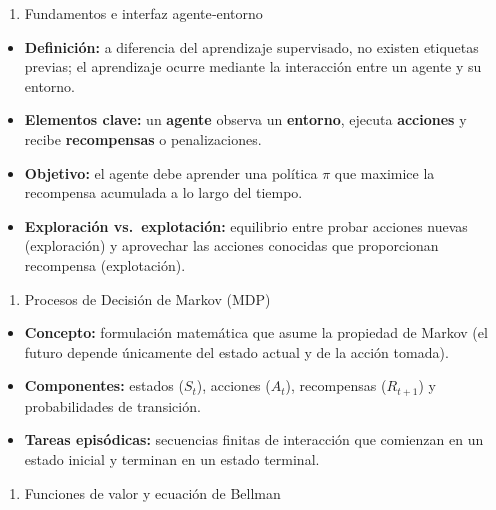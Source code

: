 \documentclass[12pt]{book} %
\providecommand{\tightlist}{%
  \setlength{\itemsep}{0pt}\setlength{\parskip}{0pt}}
\begin{document}
\begin{enumerate}
\def\labelenumi{\arabic{enumi}.}
\tightlist
\item
  Fundamentos e interfaz agente‑entorno
\end{enumerate}

\begin{itemize}
\tightlist
\item
  \textbf{Definición:} a diferencia del aprendizaje supervisado, no
  existen etiquetas previas; el aprendizaje ocurre mediante la
  interacción entre un agente y su entorno.
\item
  \textbf{Elementos clave:} un \textbf{agente} observa un
  \textbf{entorno}, ejecuta \textbf{acciones} y recibe
  \textbf{recompensas} o penalizaciones.
\item
  \textbf{Objetivo:} el agente debe aprender una política \(\pi\) que
  maximice la recompensa acumulada a lo largo del tiempo.
\item
  \textbf{Exploración vs.~explotación:} equilibrio entre probar acciones
  nuevas (exploración) y aprovechar las acciones conocidas que
  proporcionan recompensa (explotación).
\end{itemize}

\begin{enumerate}
\def\labelenumi{\arabic{enumi}.}
\setcounter{enumi}{1}
\tightlist
\item
  Procesos de Decisión de Markov (MDP)
\end{enumerate}

\begin{itemize}
\tightlist
\item
  \textbf{Concepto:} formulación matemática que asume la propiedad de
  Markov (el futuro depende únicamente del estado actual y de la acción
  tomada).
\item
  \textbf{Componentes:} estados (\(S_t\)), acciones (\(A_t\)),
  recompensas (\(R_{t+1}\)) y probabilidades de transición.
\item
  \textbf{Tareas episódicas:} secuencias finitas de interacción que
  comienzan en un estado inicial y terminan en un estado terminal.
\end{itemize}

\begin{enumerate}
\def\labelenumi{\arabic{enumi}.}
\setcounter{enumi}{2}
\tightlist
\item
  Funciones de valor y ecuación de Bellman
\end{enumerate}
\end{document}
